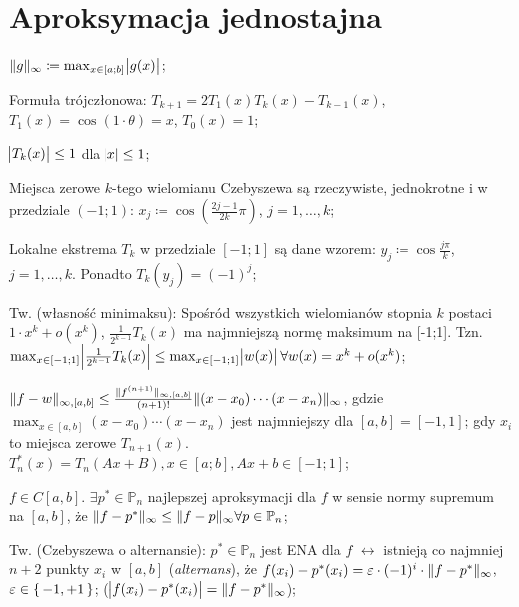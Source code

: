 \section{Aproksymacja jednostajna}

\entry
$\|g\|_\infty \coloneqq \max_{x \in [a;b]} \abs{g(x)}$;

\entry
Formuła trójczłonowa:
$T_{k + 1} = 2T_1(x)T_k(x) - T_{k-1}(x)$,
$T_1(x) = \cos(1 \cdot \theta)=x$,
$T_0(x) = 1$;

\entry
$\abs{T_k(x)} \leq 1$
dla
$\abs{x} \leq 1$;

\entry
Miejsca zerowe $k$-tego wielomianu Czebyszewa są rzeczywiste, jednokrotne i w przedziale $(-1;1)$:
$x_j \coloneqq \cos(\frac{2j-1}{2k}\pi)$, 
$j=1,\ldots,k$;

\entry
Lokalne ekstrema $T_k$ w przedziale $[-1;1]$ są dane wzorem:
$y_j \coloneqq \cos \frac{j\pi}{k}$,
$j=1,\ldots,k$.
Ponadto
$T_k(y_j) = (-1)^j$;

\entry
Tw. (własność minimaksu):
Spośród wszystkich wielomianów stopnia $k$ postaci
$1 \cdot x^k + o(x^k)$,
$\frac{1}{2^{k-1}} T_k(x)$
ma najmniejszą normę maksimum na [-1;1].
Tzn.
$\max_{x \in [-1;1]} \abs{\frac{1}{2^{k-1}} T_k(x)} \leq 
\max_{x \in [-1;1]} \abs{w(x)} 
\forall w(x) = x^k + o(x^k)$;

\entry
$\|f-w\|_{\infty, [a,b]} \leq 
\frac{\|f^{(n+1)}\|_{\infty, [a,b]}}{(n+1)!} 
\|(x-x_0) \cdots (x - x_n)\|_\infty$, 
gdzie
$\max_{x\in[a,b]} (x-x_0)\cdots(x-x_n)$
jest najmniejszy dla 
$[a,b] = [-1,1]$;
gdy $x_i$ to miejsca zerowe $T_{n + 1}(x)$.
\entry
$T^{*}_n(x) = T_n(Ax+B), x \in [a;b], Ax+b \in [-1;1]$;

\entry
$f \in C[a,b]$.
$\exists p^{*} \in \mathbb{P}_n$ 
najlepszej aproksymacji dla $f$ w sensie normy supremum na $[a,b]$, że
$\|f - p^{*}\|_\infty \leq \|f - p\|_\infty \forall p\in \mathbb{P}_n$;

\entry
Tw. (Czebyszewa o alternansie):
$p^{*} \in \mathbb{P}_n$
jest ENA dla $f$
$\leftrightarrow$
istnieją co najmniej $n+2$ punkty $x_i$ w $[a,b]$ (\textit{alternans}), że
$f(x_i) - p^{*}(x_i) = \varepsilon \cdot (-1)^i \cdot \|f - p^{*}\|_\infty$,
$\varepsilon \in \set{-1,+1}$;
($\abs{f(x_i) - p^{*}(x_i)} = \|f - p^{*}\|_\infty$);

